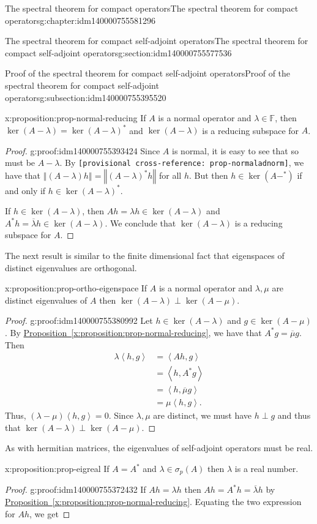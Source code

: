 \documentclass[oneside,10pt,]{book}
\newcommand{\xreffont}{\relax}
\newcommand{\mono}[1]{\texttt{#1}}
\numberwithin{equation}{section}
\newcommand{\cc}[1]{\overline{#1}}
\newcommand{\norm}[1]{\left\Vert#1\right\Vert}
\newcommand{\ip}[2]{\left\langle #1, #2 \right\rangle}
\newcommand{\ad}{^\ast}
\newcommand\la{\lambda}
\numberwithin{equation}{section}
\newcommand{\amp}{&}
\begin{document}
\begin{chapterptx}{The spectral theorem for compact operators}{}{The spectral theorem for compact operators}{}{}{g:chapter:idm140000755581296}
\begin{sectionptx}{The spectral theorem for compact self-adjoint operators}{}{The spectral theorem for compact self-adjoint operators}{}{}{g:section:idm140000755577536}
\begin{subsectionptx}{Proof of the spectral theorem for compact self-adjoint operators}{}{Proof of the spectral theorem for compact self-adjoint operators}{}{}{g:subsection:idm140000755395520}
\begin{proposition}{}{}{x:proposition:prop-normal-reducing}%
If \(A\) is a normal operator and \(\la \in \mathbb{F}\), then \(\ker(A - \la) = \ker(A - \la)\ad\) and \(\ker(A - \la)\) is a reducing subspace for \(A\).%
\end{proposition}
\begin{proof}{}{g:proof:idm140000755393424}
Since \(A\) is normal, it is easy to see that so must be \(A - \la\). By \mono{[provisional cross-reference: prop-normaladnorm]}, we have that \(\norm{(A - \la)h} = \norm{(A - \la)\ad h}\) for all \(h\). But then \(h \in \ker(A - \ad)\) if and only if \(h \in \ker(A - \la)\ad\).%
\par
If \(h \in \ker(A - \la)\), then \(Ah = \la h \in \ker(A - \la)\) and \(A\ad h = \cc\la h \in \ker(A - \la)\). We conclude that \(\ker(A - \la)\) is a reducing subspace for \(A\).%
\end{proof}
The next result is similar to the finite dimensional fact that eigenspaces of distinct eigenvalues are orthogonal.%
\begin{proposition}{}{}{x:proposition:prop-ortho-eigenspace}%
If \(A\) is a normal operator and \(\la, \mu\) are distinct eigenvalues of \(A\) then \(\ker(A - \la)\perp \ker(A - \mu)\).%
\end{proposition}
\begin{proof}{}{g:proof:idm140000755380992}
Let \(h \in \ker(A - \la)\) and \(g \in \ker(A - \mu)\). By \hyperref[x:proposition:prop-normal-reducing]{Proposition~{\xreffont\ref{x:proposition:prop-normal-reducing}}}, we have that \(A\ad g = \cc\mu g\). Then%
\begin{align*}
\la\ip{h}{g} \amp=\ip{A h}{g}\\
\amp= \ip{h}{A\ad g}\\
\amp= \ip{h}{\cc\mu g}\\
\amp= \mu\ip{h}{g}.
\end{align*}
Thus, \((\la - \mu)\ip{h}{g} = 0\). Since \(\la, \mu\) are distinct, we must have \(h\perp g\) and thus that \(\ker(A - \la) \perp \ker(A - \mu)\).%
\end{proof}
As with hermitian matrices, the eigenvalues of self-adjoint operators must be real.%
\begin{proposition}{}{}{x:proposition:prop-eigreal}%
If \(A = A\ad\) and \(\la \in \sigma_p(A)\) then \(\la\) is a real number.%
\end{proposition}
\begin{proof}{}{g:proof:idm140000755372432}
If \(A h = \la h\) then \(A h = A \ad h = \cc{\la}h\) by \hyperref[x:proposition:prop-normal-reducing]{Proposition~{\xreffont\ref{x:proposition:prop-normal-reducing}}}. Equating the two expression for \(Ah\), we get%

\end{proof}
\end{subsectionptx}
\end{sectionptx}
\end{chapterptx}
\end{document}
